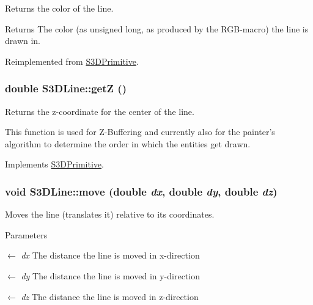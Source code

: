 Returns the color of the line. 

\begin{DoxyReturn}{Returns}
The color (as unsigned long, as produced by the RGB-\/macro) the line is drawn in. 
\end{DoxyReturn}


Reimplemented from \hyperlink{class_s3_d_primitive_a4102845e7754e44c51a87c0fcb391c73}{S3DPrimitive}.

\hypertarget{class_s3_d_line_a72aabdbb4d3d0c3ea36f5fda7b059f6a}{
\subsubsection[{getZ}]{\setlength{\rightskip}{0pt plus 5cm}double S3DLine::getZ ()}}
\label{class_s3_d_line_a72aabdbb4d3d0c3ea36f5fda7b059f6a}


Returns the z-\/coordinate for the center of the line. 

This function is used for Z-\/Buffering and currently also for the painter's algorithm to determine the order in which the entities get drawn. 

Implements \hyperlink{class_s3_d_primitive_ab5b06d3a8e83216cc42554bb78afd2d9}{S3DPrimitive}.

\hypertarget{class_s3_d_line_a38203e499c32f14ff5da3b7c17861881}{
\subsubsection[{move}]{\setlength{\rightskip}{0pt plus 5cm}void S3DLine::move (double {\em dx}, \/  double {\em dy}, \/  double {\em dz})}}
\label{class_s3_d_line_a38203e499c32f14ff5da3b7c17861881}


Moves the line (translates it) relative to its coordinates. 


\begin{DoxyParams}{Parameters}
\item[\mbox{$\leftarrow$} {\em dx}]The distance the line is moved in x-\/direction \item[\mbox{$\leftarrow$} {\em dy}]The distance the line is moved in y-\/direction \item[\mbox{$\leftarrow$} {\em dz}]The distance the line is moved in z-\/direction \end{DoxyParams}


